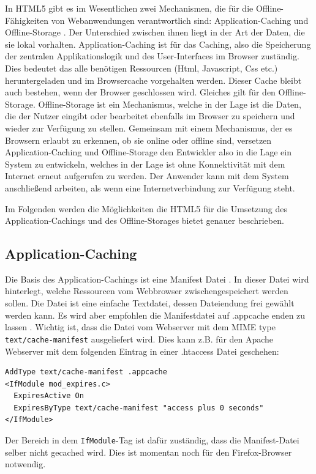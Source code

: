 In HTML5 gibt es im Wesentlichen zwei Mechanismen, die für die Offline-Fähigkeiten von Webanwendungen verantwortlich sind: Application-Caching und Offline-Storage \cite{Mahemoff22010}. Der Unterschied zwischen ihnen liegt in der Art der Daten, die sie lokal vorhalten. Application-Caching ist für das Caching, also die Speicherung der zentralen Applikationslogik und des User-Interfaces im Browser zuständig. Dies bedeutet das alle benötigen Ressourcen (Html, Javascript, Css etc.) heruntergeladen und im Browsercache vorgehalten werden. Dieser Cache bleibt auch bestehen, wenn der Browser geschlossen wird. Gleiches gilt für den Offline-Storage. Offline-Storage ist ein Mechanismus, welche in der Lage ist die Daten, die der Nutzer eingibt oder bearbeitet ebenfalls im Browser zu speichern und wieder zur Verfügung zu stellen. Gemeinsam mit einem Mechanismus, der es Browsern erlaubt zu erkennen, ob sie online oder offline sind, versetzen Application-Caching und Offline-Storage den Entwickler also in die Lage ein System zu entwickeln, welches in der Lage ist ohne Konnektivität mit dem Internet erneut aufgerufen zu werden. Der Anwender kann mit dem System anschließend arbeiten, als wenn eine Internetverbindung zur Verfügung steht.

Im Folgenden werden die Möglichkeiten die HTML5 für die Umsetzung des Application-Cachings und des Offline-Storages bietet genauer beschrieben.

\subsection{Application-Caching}\label{section:appcache}
Die Basis des Application-Cachings ist eine Manifest Datei \cite{Bidelman2010}. In dieser Datei wird hinterlegt, welche Ressourcen vom Webbrowser zwischengespeichert werden sollen. Die Datei ist eine einfache Textdatei, dessen Dateiendung frei gewählt werden kann. Es wird aber empfohlen die Manifestdatei auf .appcache enden zu lassen \cite{W3C2012}. Wichtig ist, dass die Datei vom Webserver mit dem MIME type \texttt{text/cache-manifest} ausgeliefert wird. Dies kann z.B. für den  Apache Webserver mit dem folgenden Eintrag in einer .htaccess Datei geschehen:
\begin{lstlisting}
AddType text/cache-manifest .appcache
<IfModule mod_expires.c>
  ExpiresActive On
  ExpiresByType text/cache-manifest "access plus 0 seconds"
</IfModule>
\end{lstlisting}
Der Bereich in dem \texttt{IfModule}-Tag ist dafür zuständig, dass die Manifest-Datei selber nicht gecached wird. Dies ist momentan noch für den Firefox-Browser notwendig.

